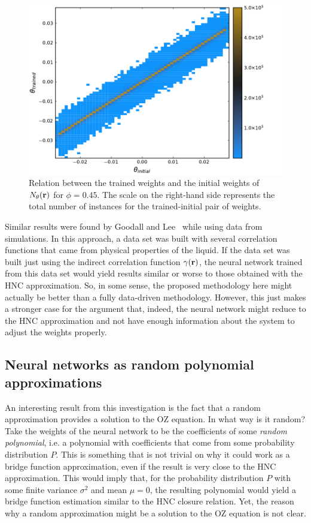 \begin{figure}[t]
    \includegraphics[width=\textwidth]{figuras/capitulo-3/weights_phi=0.45.pdf}
    \caption[Comparison between weights, $\phi=0.45$.]{Relation between the trained weights and the initial weights of $N_{\theta}(\mathbf{r})$ for $\phi=0.45$. The scale on the right-hand side represents the total number of instances for the trained-initial pair of weights.}
    \label{fig:pesos45}
\end{figure}

Similar results were found by Goodall and Lee~\cite{a.goodallDatadrivenApproximationsBridge2021}
while using data from simulations. In this approach, a data set was built with several
correlation functions that came from physical properties of the liquid. If the data set was built
just using the indirect correlation function $\gamma(\mathbf{r})$, the neural network trained from this data
set would yield results similar or worse to those obtained with the HNC approximation.
So, in some sense, the proposed methodology here might actually be better than a fully
data-driven methodology. However, this just makes a stronger case for the argument that,
indeed, the neural network might reduce to the HNC approximation and not have enough
information about the system to adjust the weights properly.

\subsection{Neural networks as random polynomial approximations}
An interesting result from this investigation is the fact that a random approximation
provides a solution to the OZ equation. In what way is it random? Take the weights of the
neural network to be the coefficients of some \emph{random polynomial}, i.e. a polynomial 
with coefficients that come from some probability distribution $P$. This is something that 
is not trivial on why it could work as a bridge function approximation, even if the result
is very close to the HNC approximation. This would imply that, for the probability 
distribution $P$ with some finite variance $\sigma^2$ and mean $\mu=0$, the resulting
polynomial would yield a bridge function estimation similar to the HNC closure relation.
Yet, the reason why a random approximation might be a solution to the OZ equation is not
clear.

